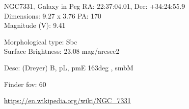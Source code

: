 \begin{block}{NGC7331, Galaxy in Peg}
    RA: 22:37:04.01, Dec: +34:24:55.9 \\ 
    Dimensions: 9.27 x 3.76 PA: 170 \\ 
    Magnitude (V): 9.41

    Morphological type: Sbc \\ 
    Surface Brightness: 23.08 mag/arcsec2 

    Desc: (Dreyer) B, pL, pmE 163deg , smbM 

    Finder fov: 60 

    \url{https://en.wikipedia.org/wiki/NGC_7331} 
\end{block}